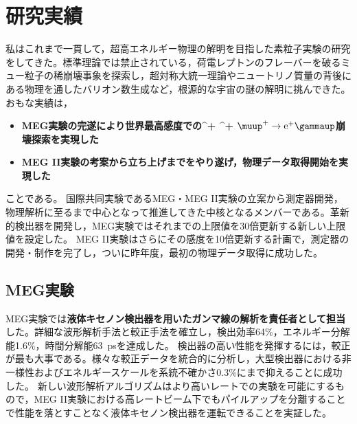 \documentclass[11pt,a4paper,uplatex,dvipdfmx]{ujarticle} 		%
\newcommand{\研究課題名}{象の卵}
\newcommand{\研究機関名}{東京大学}
\newcommand{\研究代表者氏名}{内山雄祐}
\newcommand{\研究期間の最終元号年度}{6}  %
\renewcommand{\emph}[1]{{\sffamily\bfseries{#1}}}
\newcommand*{\megc}{\ifmmode\muup^+ \to \mathrm{e}^+ \gammaup\else$\muup^+ \to \mathrm{e}^+ \gammaup$\fi}
\begin{document}



%
\noindent


	
\newpage

\section{研究実績}
\vspace{2zw}

私はこれまで一貫して，超高エネルギー物理の解明を目指した素粒子実験の研究をしてきた。標準理論では禁止されている，荷電レプトンのフレーバーを破るミュー粒子の稀崩壊事象を探索し，超対称大統一理論やニュートリノ質量の背後にある物理を通したバリオン数生成など，根源的な宇宙の謎の解明に挑んできた。
おもな実績は，
\begin{itemize}
  \setlength{\parskip}{0cm} %
  \setlength{\itemsep}{0cm} %
\item	\emph{MEG実験の完遂により世界最高感度での\megc 崩壊探索を実現した}
\item	\emph{MEG II実験の考案から立ち上げまでをやり遂げ，物理データ取得開始を実現した}
\end{itemize}
ことである。
国際共同実験であるMEG・MEG II実験の立案から測定器開発，物理解析に至るまで中心となって推進してきた中核となるメンバーである。革新的検出器を開発し\cite{Adam:2013vqa}，MEG実験ではそれまでの上限値を30倍更新する新しい上限値を設定した\cite{TheMEG:2016wtm}。
MEG II実験はさらにその感度を10倍更新する計画で\cite{upgrade_proposal, Baldini:2018nnn}，測定器の開発・制作を完了し\cite{Mori:highenergy}，ついに昨年度，最初の物理データ取得に成功した\cite{cdch_2023,ptc_2023,trigger_2023,xec_2023}。

\subsection{MEG実験}
MEG実験では\emph{液体キセノン検出器を用いたガンマ線の解析を責任者として担当}した。詳細な波形解析手法と較正手法を確立し，検出効率64\%，エネルギー分解能1.6\%，時間分解能63~psを達成した\cite{gamma_rec, TheMEG:2016wtm}。
検出器の高い性能を発揮するには，較正が最も大事である。様々な較正データを統合的に分析し，大型検出器における非一様性およびエネルギースケールを系統不確かさ0.3\%にまで抑えることに成功した。
新しい波形解析アルゴリズムはより高いレートでの実験を可能にするもので，MEG II実験における高レートビーム下でもパイルアップを分離することで性能を落とすことなく液体キセノン検出器を運転できることを実証した。
\end{document}
